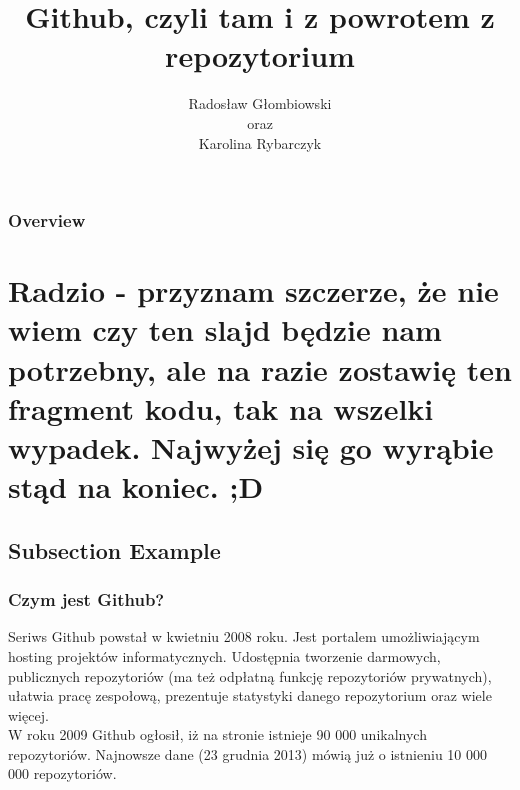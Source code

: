 \documentclass{beamer}
\title[To w tym szablonie i tak nie działa]{Github, czyli tam i z powrotem z repozytorium} %
\author{Radosław Głombiowski\\oraz\\Karolina Rybarczyk} %
\institute{
Uniwesytet Gdański\\ %
\medskip
\textit{john@smith.com, szprota@rybki.com.pl} %
}
\date{} %
\begin{document}
	\begin{frame}
		\titlepage %
	\end{frame}


	\begin{frame}
		\frametitle{Overview} %
		\tableofcontents %
	\end{frame}


	\section{Radzio - przyznam szczerze, że nie wiem czy ten slajd będzie nam potrzebny, ale na razie zostawię ten fragment kodu, tak na wszelki wypadek. Najwyżej się go wyrąbie stąd na koniec. ;D} %


	\subsection{Subsection Example} %




	\begin{frame}
		\frametitle{Czym jest Github?}
		Seriws Github powstał w kwietniu 2008 roku. Jest portalem umożliwiającym hosting projektów informatycznych. Udostępnia tworzenie darmowych, publicznych repozytoriów (ma też odpłatną funkcję repozytoriów prywatnych), ułatwia pracę zespołową, prezentuje statystyki danego repozytorium oraz wiele więcej.\\
		W roku 2009 Github ogłosił, iż na stronie istnieje 90 000 unikalnych repozytoriów. Najnowsze dane (23 grudnia 2013) mówią już o istnieniu 10 000 000 repozytoriów.
	\end{frame}
\end{document}
